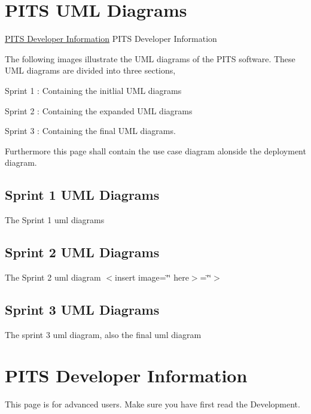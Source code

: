 \hypertarget{page1_sec3}{}\section{P\+I\+T\+S U\+M\+L Diagrams}\label{page1_sec3}
\hyperlink{Information}{P\+I\+TS Developer Information} P\+I\+TS Developer Information

The following images illustrate the U\+ML diagrams of the P\+I\+TS software. These U\+ML diagrams are divided into three sections,
\begin{DoxyItemize}
\item Sprint 1 \+: Containing the initlial U\+ML diagrams
\item Sprint 2 \+: Containing the expanded U\+ML diagrams
\item Sprint 3 \+: Containing the final U\+ML diagrams.
\end{DoxyItemize}

Furthermore this page shall contain the use case diagram alonside the deployment diagram.\hypertarget{page1_subsection1}{}\subsection{Sprint 1 U\+M\+L Diagrams}\label{page1_subsection1}
The Sprint 1 uml diagrams  \hypertarget{page1_subsection2}{}\subsection{Sprint 2 U\+M\+L Diagrams}\label{page1_subsection2}
The Sprint 2 uml diagram $<$insert image=\char`\"{}\char`\"{} here$>$=\char`\"{}\char`\"{}$>$ \hypertarget{page1_subsection3}{}\subsection{Sprint 3 U\+M\+L Diagrams}\label{page1_subsection3}
The sprint 3 uml diagram, also the final uml diagram \hypertarget{Information}{}\section{P\+I\+TS Developer Information}\label{Information}
This page is for advanced users. Make sure you have first read the Development. 
